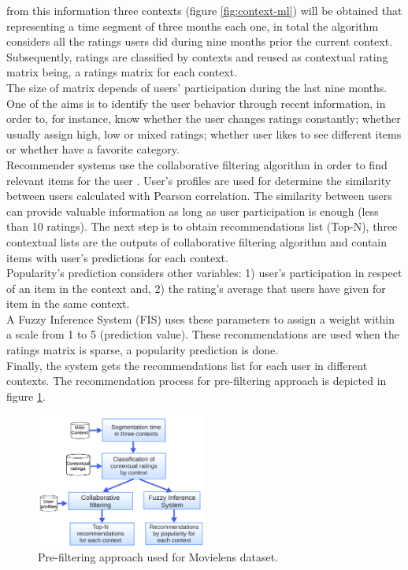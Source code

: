 from this information three contexts
(figure \ref{fig:context-ml}) will be obtained that representing a
time segment of three months each one, in total the algorithm
considers all the ratings users did during nine months prior the
current context. Subsequently, ratings are classified by contexts and
reused as contextual rating matrix being, a ratings matrix for each
context. \\The size of matrix depends of users' participation during
the last nine months. One of the aims is to identify the user behavior
through recent information, in order to, for instance, know whether
the user changes ratings constantly; whether usually assign high, low
or mixed ratings; whether user likes to see different items or whether
have a favorite category.\\  Recommender systems use the collaborative
filtering algorithm in order to find relevant items for the user
\cite{ramirez2013restaurant}. User's profiles are used for determine
the similarity between users calculated with Pearson correlation. The
similarity between users can provide valuable information as long as
user participation is enough (less than 10 ratings). The next step is
to obtain recommendations list (Top-N), three contextual lists are the
outputs of collaborative filtering algorithm and contain items with
user's predictions for each context.\\Popularity's prediction
considers other variables: 1) user’s participation in respect of an
item in the context and, 2) the rating's average that users have given
for item in the same context. \\A Fuzzy Inference System (FIS) uses
these parameters to assign a weight within a scale from 1 to 5
(prediction value). These recommendations are used when the ratings
matrix is sparse, a popularity prediction is done. \\Finally, the
system gets the recommendations list for each user in different
contexts. The recommendation process for pre-filtering approach
 is depicted in figure \ref{fig:archi-ml}.
\begin{figure}
\captionsetup{justification=centering,margin=2cm,font=footnotesize}
\centering
\setlength\fboxsep{0pt}
\includegraphics[width=0.50\textwidth]{img/archi-ml.png}
\caption{Pre-filtering approach used for Movielens dataset.}
\label{fig:archi-ml}     
\end{figure}

